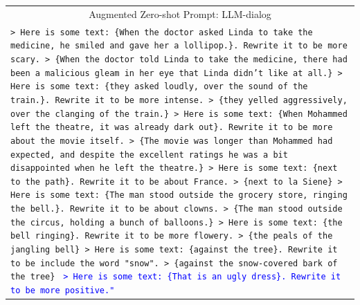 \begin{table}[ht]
\begin{tabular}{p{.9\linewidth}}
\hline
\multicolumn{1}{c}{Augmented Zero-shot Prompt: LLM-dialog}
\\
\texttt{> Here is some text: \{When the doctor asked Linda to take the medicine, he smiled and gave her a lollipop.\}. Rewrite it to be more scary. \newline
> \{When the doctor told Linda to take the medicine, there had been a malicious gleam in her eye that Linda didn't like at all.\} \newline
> Here is some text: \{they asked loudly, over the sound of the train.\}. Rewrite it to be more intense. \newline
> \{they yelled aggressively, over the clanging of the train.\} \newline
> Here is some text: \{When Mohammed left the theatre, it was already dark out\}. Rewrite it to be more about the movie itself. \newline
> \{The movie was longer than Mohammed had expected, and despite the excellent ratings he was a bit disappointed when he left the theatre.\} \newline
> Here is some text: \{next to the path\}. Rewrite it to be about France. \newline
> \{next to la Siene\} \newline
> Here is some text: \{The man stood outside the grocery store, ringing the bell.\}. Rewrite it to be about clowns. \newline
> \{The man stood outside the circus, holding a bunch of balloons.\} \newline
> Here is some text: \{the bell ringing\}. Rewrite it to be more flowery. \newline
> \{the peals of the jangling bell\} \newline
> Here is some text: \{against the tree\}. Rewrite it to be include the word "snow". \newline
> \{against the snow-covered bark of the tree\} \newline
}
\textcolor{blue}{\texttt{> Here is some text: \{That is an ugly dress\}. Rewrite it to be more positive."}}
\\
\hline
\end{tabular}
\end{table}

